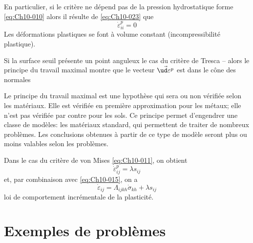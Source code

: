 En particulier, si le critère ne dépend pas de la pression hydrostatique forme \eqref{eq:Ch10-010} alors il résulte de \eqref{eq:Ch10-023} que 
\begin{equation}
    \dot{\varepsilon}_{ii}^p = 0
    \label{eq:Ch10-024}
\end{equation}
Les déformations plastiques se font à volume constant (incompressibilité plastique). 

Si la surface seuil présente un point anguleux le cas du critère de Tresca -- alors le principe du travail maximal montre que le vecteur $\vec{\ud \varepsilon^p}$ est dans le cône des normales  
\begin{center}
\end{center}

Le principe du travail maximal est une hypothèse qui sera ou non vérifiée selon les matériaux.
Elle est vérifiée en première approximation pour les métaux; elle n'est pas vérifiée par contre pour les sols.
Ce principe permet d'engendrer une classe de modèles: les matériaux standard, qui permettent de traiter de nombreux problèmes.
Les conclusions obtenues à partir de ce type de modèle seront plus ou moins valables selon les problèmes.

Dans le cas du critère de von Mises \eqref{eq:Ch10-011}, on obtient 
\begin{equation}
    \dot{\varepsilon}_{ij}^p = \lambda s_{ij}
    \label{eq:Ch10-025}
\end{equation}
et, par combinaison avec \eqref{eq:Ch10-015}, on a 
\begin{equation}
    \dot{\varepsilon}_{ij} = \Lambda_{ijkh} \dot{\sigma}_{kh} + \lambda s_{ij}
    \label{eq:Ch10-026}
\end{equation}
loi de comportement incrémentale de la plasticité. 

\section{Exemples de problèmes} \label{sec:Ch10-2}

